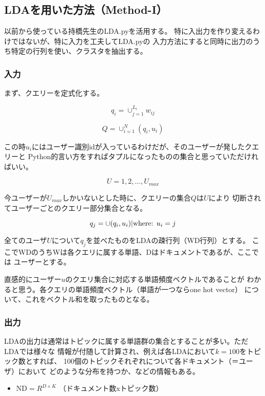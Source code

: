 \documentclass[uplatex]{jsarticle}
\begin{document}
\subsection{LDAを用いた方法（Method-I）}
以前から使っている持橋先生のLDA.pyを活用する。
特に入出力を作り変えるわけではないが、特に入力を工夫してLDA.pyの
入力方法にすると同時に出力のうち特定の行列を使い、クラスタを抽出する。

\subsubsection{入力}
まず、クエリーを定式化する。

\begin{displaymath}
q_i = \cup_{j=1}^{L_i} w_{ij}
\end{displaymath}

\begin{displaymath}
Q = \cup_{i=1}^{N} (q_i, u_i)
\end{displaymath}

この時$u_i$にはユーザー識別idが入っているわけだが、そのユーザーが発したクエリーと
Python的言い方をすればタプルになったものの集合と思っていただければいい。

\begin{displaymath}
U = 1, 2, \ldots, U_{max}
\end{displaymath}

今ユーザーが$U_{max}$しかいないとした時に、クエリーの集合$Q$は$U$により
切断されてユーザーごとのクエリー部分集合となる。

\begin{displaymath}
q_j = \cup (q_i, u_i) | \mbox{where: }\/\/  u_i = j 
\end{displaymath}

全てのユーザ$U$について$q_j$を並べたものをLDAの疎行列（WD行列）とする。
ここでWDのうちWは各クエリに属する単語、Dはドキュメントであるが、ここでは
ユーザーとする。

直感的にユーザー$u$のクエリ集合に対応する単語頻度ベクトルであることが
わかると思う。各クエリの単語頻度ベクトル（単語が一つならone hot vector）
について、これをベクトル和を取ったものとなる。

\subsubsection{出力}

LDAの出力は通常はトピックに属する単語群の集合とすることが多い。ただLDAでは様々な
情報が付随して計算され、例えば各LDAにおいて$k=100$をトピック数とすれば、
100個のトピックそれぞれについて各ドキュメント（＝ユーザ）において
どのような分布を持つか、などの情報もある。
\begin{itemize}
\item $\mbox{ND} = R^{D\times K}$ （ドキュメント数xトピック数）
\end{itemize}
\end{document}
